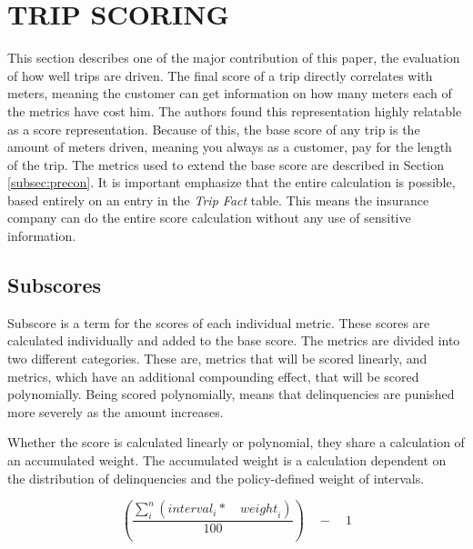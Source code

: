 \section{TRIP SCORING}\label{sec:trip}
This section describes one of the major contribution of this paper, the evaluation of how well trips are driven. The final score of a trip directly correlates with meters, meaning the customer can get information on how many meters each of the metrics have cost him. The authors found this representation highly relatable as a score representation.
Because of this, the base score of any trip is the amount of meters driven, meaning you always as a customer, pay for the length of the trip. The metrics used to extend the base score are described in Section \ref{subsec:precon}.
It is important emphasize that the entire calculation is possible, based entirely on an entry in the \textit{Trip Fact} table. This means the insurance company can do the entire score calculation without any use of sensitive information.

\subsection{Subscores} 
Subscore is a term for the scores of each individual metric. These scores are calculated individually and added to the base score. The metrics are divided into two different categories. These are, metrics that will be scored linearly, and metrics, which have an additional compounding effect, that will be scored polynomially. Being scored polynomially, means that delinquencies are punished more severely as the amount increases.

Whether the score is calculated linearly or polynomial, they share a calculation of an accumulated weight. The accumulated weight is a calculation dependent on the distribution of delinquencies and the policy-defined weight of intervals.

$$
\left( \frac { \sum _{ i }^{ n }{ \left( { interval }_{ i }*\quad { weight }_{ i } \right)  }  }{ 100 }  \right) \quad -\quad 1
$$

